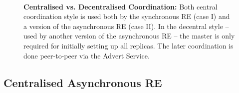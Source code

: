 \documentclass{rspublic}
\newcommand{\athotanote}[1]{ {\textcolor{green} { ***athota: #1 }}}
\newcommand{\athotanote}[1]{}
\begin{document}
\begin{figure}%
\centering
{}\qquad
{}\\
\caption{\textbf{Centralised vs. Decentralised Coordination:} Both central coordination style
is used both by the synchronous RE (case I) and a version of the asynchronous RE (case II). 
In the decentral style -- used by another version of the asynchronous RE -- the master is only required
for initially setting up all replicas. The later coordination is done peer-to-peer via the Advert Service.}
\label{fig:coordination}
\end{figure}


\subsection{Centralised Asynchronous RE}


\end{document}
